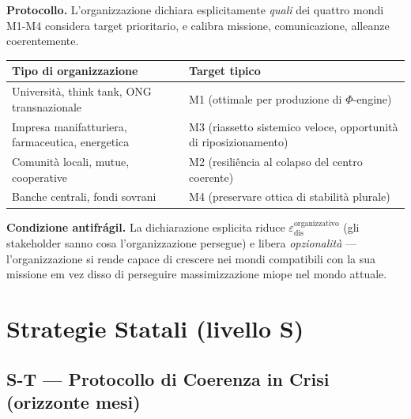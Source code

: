 \Hypoth{} \textbf{Protocollo.} L'organizzazione dichiara esplicitamente
\emph{quali} dei quattro mondi M1-M4 considera target prioritario, e
calibra missione, comunicazione, alleanze coerentemente.

{\def\LTcaptype{none} %
{\small\begin{longtable}[]{@{}
  >{\raggedright\arraybackslash}p{}
  >{\raggedright\arraybackslash}p{}@{}}
\toprule\noalign{}
\begin{minipage}[b]{\linewidth}\raggedright
Tipo di organizzazione
\end{minipage} & \begin{minipage}[b]{\linewidth}\raggedright
Target tipico
\end{minipage} \\
\midrule\noalign{}
\endhead
\bottomrule\noalign{}
\endlastfoot
Università, think tank, ONG transnazionale & M1 (ottimale per produzione
di \(\Phi\)-engine) \\
Impresa manifatturiera, farmaceutica, energetica & M3 (riassetto
sistemico veloce, opportunità di riposizionamento) \\
Comunità locali, mutue, cooperative & M2 (resiliência al colapso del
centro coerente) \\
Banche centrali, fondi sovrani & M4 (preservare ottica di stabilità
plurale) \\
\end{longtable}}
}

\Proved{} \textbf{Condizione antifrágil.} La dichiarazione esplicita
riduce \(\varepsilon_{\text{dis}}^{\text{organizzativo}}\) (gli
stakeholder sanno cosa l'organizzazione persegue) e libera
\emph{opzionalità} --- l'organizzazione si rende capace di crescere nei
mondi compatibili con la sua missione em vez disso di perseguire
massimizzazione miope nel mondo attuale.



\section{Strategie Statali (livello
S)}\label{strategie-statali-livello-s}

\subsection{S-T --- Protocollo di Coerenza in Crisi (orizzonte
mesi)}\label{s-t-protocollo-di-coerenza-in-crisi-orizzonte-mesi}

